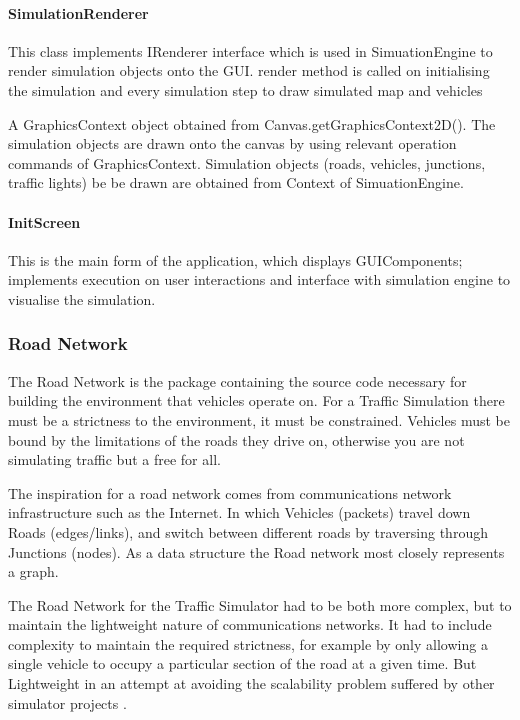 \documentclass[11pt]{article}
\begin{document}
{\begin{itemize}
    
    
    \paragraph{SimulationRenderer}
    
    This class implements IRenderer interface which is used in SimuationEngine to render simulation objects onto the GUI. render method is called on initialising the simulation and every simulation step to draw simulated map and vehicles
    
    A GraphicsContext object obtained from  Canvas.getGraphicsContext2D(). The simulation objects are drawn onto the canvas by using relevant operation commands of GraphicsContext.
    Simulation objects (roads, vehicles, junctions, traffic lights) be be drawn are obtained from Context of SimuationEngine. 
    
    \paragraph{InitScreen}
    This is the main form of the application, which displays GUIComponents; implements execution on user interactions and  interface with simulation engine to visualise the simulation. 
    
    
\pagebreak
\subsubsection{Road Network}

The Road Network is the package containing the source code necessary for building the environment that vehicles operate on. For a Traffic Simulation there must be a strictness to the environment, it must be constrained. Vehicles must be bound by the limitations of the roads they drive on, otherwise you are not simulating traffic but a free for all.

The inspiration for a road network comes from communications network infrastructure such as the Internet. In which Vehicles (packets) travel down Roads (edges/links), and switch between different roads by traversing through Junctions (nodes). As a data structure the Road network most closely represents a graph.

The Road Network for the Traffic Simulator had to be both more complex, but to maintain the lightweight nature of communications networks. It had to include complexity to maintain the required strictness, for example by only allowing a single vehicle to occupy a particular section of the road at a given time. But Lightweight in an attempt at avoiding the scalability problem suffered by other simulator projects \cite{website:SUMO-SimOfUrbMob}.



\end{itemize}}
\end{document}
